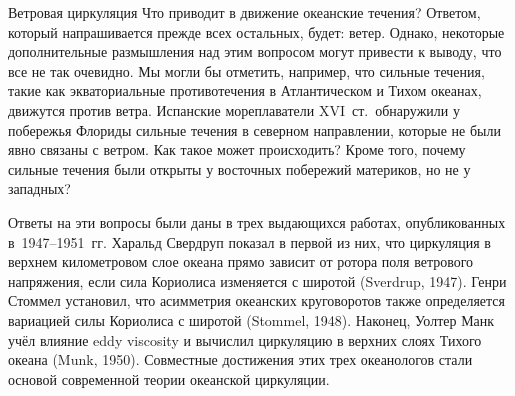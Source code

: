 
\begin{chapter}{Ветровая циркуляция}\label{chap:11}
Что приводит в движение океанские течения? Ответом, который напрашивается
прежде всех остальных, будет: ветер. Однако, некоторые дополнительные 
размышления над этим вопросом могут привести к выводу, что все не так очевидно.
Мы могли бы отметить, например, что сильные течения, такие как 
экваториальные противотечения в Атлантическом и Тихом океанах, 
движутся против ветра. Испанские мореплаватели XVI~ст.\ обнаружили у
побережья Флориды сильные течения в северном направлении, которые не были
явно связаны с ветром. Как такое может происходить? Кроме того, почему сильные
течения были открыты у восточных побережий материков, но не у западных?
%

Ответы на эти вопросы были даны в трех выдающихся работах, опубликованных
в~1947--1951~гг. Харальд Свердруп показал в первой из них, что циркуляция
в верхнем километровом слое океана прямо зависит от ротора поля ветрового
напряжения, если сила Кориолиса изменяется
с широтой (Sverdrup, 1947). Генри Стоммел установил, что асимметрия
океанских круговоротов также определяется вариацией силы Кориолиса 
с широтой (Stommel, 1948). Наконец, Уолтер Манк учёл влияние 
eddy viscosity и вычислил циркуляцию в верхних слоях Тихого 
океана (Munk, 1950). Совместные достижения этих трех океанологов 
стали основой современной теории океанской циркуляции.
%


\end{chapter}
